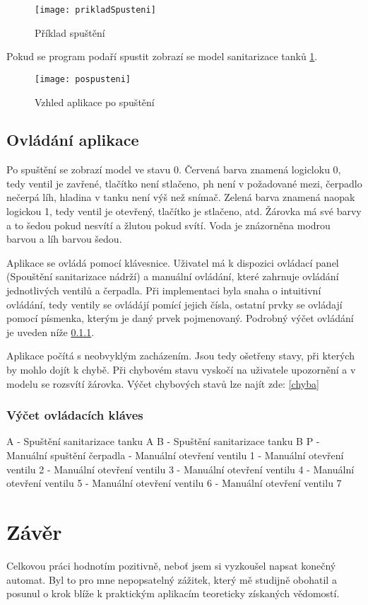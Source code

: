 \documentclass[12pt, a4paper]{article}
\begin{document}
\begin{figure}[h]
\centering 
\texttt{[image: prikladSpusteni]}
\caption{Příklad spuštění}
\end{figure}

Pokud se program podaří spustit zobrazí se model sanitarizace tanků \ref{vzhled}.

\begin{figure}
\centering 
\texttt{[image: pospusteni]}
\caption{Vzhled aplikace po spuštění}
\label{vzhled}
\end{figure}

\subsection{Ovládání aplikace}
Po spuštění se zobrazí model ve stavu 0. Červená barva znamená logicloku 0, tedy ventil je zavřené, tlačítko není stlačeno, ph není v požadované mezi, čerpadlo nečerpá líh, hladina v tanku není výš než snímač. Zelená barva znamená naopak logickou 1, tedy ventil je otevřený, tlačítko je stlačeno, atd. Žárovka má své barvy a to šedou pokud nesvítí a žlutou pokud svítí. Voda je znázorněna modrou barvou a líh barvou šedou.

Aplikace se ovládá pomocí klávesnice. Uživatel má k dispozici ovládací panel (Spouštění sanitarizace nádrží) a manuální ovládání, které zahrnuje ovládání jednotlivých ventilů a čerpadla. Při implementaci byla snaha o intuitivní ovládání, tedy ventily se ovládájí pomící jejich čísla, ostatní prvky se ovládají pomocí písmenka, kterým je daný prvek pojmenovaný. Podrobný výčet ovládání je uveden níže \ref{ovladani}.

Aplikace počítá s neobvyklým zacházením. Jsou tedy ošetřeny stavy, při kterých by mohlo dojít k chybě. Při chybovém stavu vyskočí na uživatele upozornění a v modelu se rozsvítí žárovka. Výčet chybových stavů lze najít zde: \ref{chyba}

\subsubsection{Výčet ovládacích kláves} \label{ovladani}
A - Spuštění sanitarizace tanku A \newline 
B - Spuštění sanitarizace tanku B \newline 
P - Manuální spuštění čerpadla  - Manuální otevření ventilu 1  - Manuální otevření ventilu 2  - Manuální otevření ventilu 3  - Manuální otevření ventilu 4  - Manuální otevření ventilu 5  - Manuální otevření ventilu 6  - Manuální otevření ventilu 7 \newline 

\section{Závěr}
Celkovou práci hodnotím pozitivně, neboť jsem si vyzkoušel napsat konečný automat. Byl to pro mne nepopsatelný zážitek, který mě studijně obohatil a posunul o krok blíže k praktickým aplikacím teoreticky získaných vědomostí. 
\end{document}
